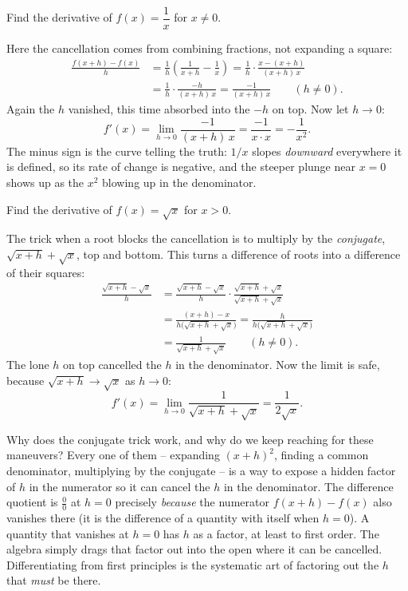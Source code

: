 \begin{example}
\label{ch10:ex-recip}
Find the derivative of $f(x) = \dfrac{1}{x}$ for $x \neq 0$.
\end{example}

\noindent Here the cancellation comes from combining fractions, not expanding a
square:
\begin{align*}
  \frac{f(x+h) - f(x)}{h}
  &= \frac{1}{h}\left( \frac{1}{x + h} - \frac{1}{x} \right)
   = \frac{1}{h} \cdot \frac{x - (x + h)}{(x + h)\,x} \\[4pt]
  &= \frac{1}{h} \cdot \frac{-h}{(x + h)\,x}
   = \frac{-1}{(x + h)\,x} \qquad (h \neq 0).
\end{align*}
Again the $h$ vanished, this time absorbed into the $-h$ on top. Now let $h \to 0$:
\[
  f'(x) = \lim_{h \to 0} \frac{-1}{(x + h)\,x} = \frac{-1}{x \cdot x} = -\frac{1}{x^2}.
\]
The minus sign is the curve telling the truth: $1/x$ slopes \emph{downward}
everywhere it is defined, so its rate of change is negative, and the steeper plunge
near $x = 0$ shows up as the $x^2$ blowing up in the denominator.

\begin{example}
\label{ch10:ex-sqrt}
Find the derivative of $f(x) = \sqrt{x}$ for $x > 0$.
\end{example}

\noindent The trick when a root blocks the cancellation is to multiply by the
\emph{conjugate}, $\sqrt{x+h} + \sqrt{x}$, top and bottom. This turns a difference
of roots into a difference of their squares:
\begin{align*}
  \frac{\sqrt{x + h} - \sqrt{x}}{h}
  &= \frac{\sqrt{x + h} - \sqrt{x}}{h}
     \cdot \frac{\sqrt{x + h} + \sqrt{x}}{\sqrt{x + h} + \sqrt{x}} \\[4pt]
  &= \frac{(x + h) - x}{h\bigl(\sqrt{x + h} + \sqrt{x}\bigr)}
   = \frac{h}{h\bigl(\sqrt{x + h} + \sqrt{x}\bigr)} \\[4pt]
  &= \frac{1}{\sqrt{x + h} + \sqrt{x}} \qquad (h \neq 0).
\end{align*}
The lone $h$ on top cancelled the $h$ in the denominator. Now the limit is safe,
because $\sqrt{x+h} \to \sqrt{x}$ as $h \to 0$:
\[
  f'(x) = \lim_{h \to 0} \frac{1}{\sqrt{x + h} + \sqrt{x}}
        = \frac{1}{2\sqrt{x}}.
\]

\begin{whybox}
Why does the conjugate trick work, and why do we keep reaching for these
maneuvers? Every one of them -- expanding $(x+h)^2$, finding a common
denominator, multiplying by the conjugate -- is a way to expose a hidden factor
of $h$ in the numerator so it can cancel the $h$ in the denominator. The
difference quotient is $\frac00$ at $h=0$ precisely \emph{because} the numerator
$f(x+h) - f(x)$ also vanishes there (it is the difference of a quantity with
itself when $h=0$). A quantity that vanishes at $h=0$ has $h$ as a factor, at
least to first order. The algebra simply drags that factor out into the open where
it can be cancelled. Differentiating from first principles is the systematic art
of factoring out the $h$ that \emph{must} be there.
\end{whybox}

